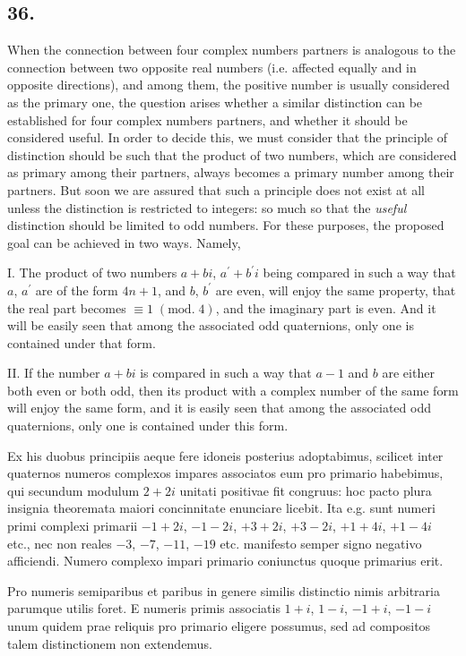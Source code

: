 \documentclass[twoside,12pt, showframe]{memoir}
\renewcommand{\pmod}[1]{\;(\textrm{mod.}\;#1)}
\begin{document}
\subsection*{36.}
 
When the connection between four complex numbers partners is analogous to the connection between two opposite real numbers (i.e. affected equally and in opposite directions), and among them, the positive number is usually considered as the primary one, the question arises whether a similar distinction can be established for four complex numbers partners, and whether it should be considered useful. In order to decide this, we must consider that the principle of distinction should be such that the product of two numbers, which are considered as primary among their partners, always becomes a primary number among their partners. But soon we are assured that such a principle does not exist at all unless the distinction is restricted to integers: so much so that the \textit{useful} distinction should be limited to odd numbers. For these purposes, the proposed goal can be achieved in two ways. Namely,
 
I. The product of two numbers \(a+b i\), \(a^{\prime}+b^{\prime} i\) being compared in such a way that \(a\), \(a^{\prime}\) are of the form \(4 n+1\), and \(b\), \(b^{\prime}\) are even, will enjoy the same property, that the real part becomes \(\equiv 1\pmod{4}\), and the imaginary part is even. And it will be easily seen that among the associated odd quaternions, only one is contained under that form.
 
II. If the number \(a+b i\) is compared in such a way that \(a-1\) and \(b\) are either both even or both odd, then its product with a complex number of the same form will enjoy the same form, and it is easily seen that among the associated odd quaternions, only one is contained under this form.
%

Ex his duobus principiis aeque fere idoneis posterius adoptabimus, scilicet inter quaternos numeros complexos impares associatos eum pro primario habebimus, qui secundum modulum $2+2 i$ unitati positivae fit congruus: hoc pacto plura insignia theoremata maiori concinnitate enunciare licebit. Ita e.g. sunt numeri primi complexi primarii $-1+2 i$, $-1-2 i$, $+3+2 i$, $+3-2 i$, $+1+4 i$, $+1-4 i$ etc., nec non reales $-3$, $-7$, $-11$, $-19$ etc. manifesto semper signo negativo afficiendi. Numero complexo impari primario coniunctus quoque primarius erit.

Pro numeris semiparibus et paribus in genere similis distinctio nimis arbitraria parumque utilis foret. E numeris primis associatis $1+i$, $1-i$, $-1+i$, $-1-i$ unum quidem prae reliquis pro primario eligere possumus, sed ad compositos talem distinctionem non extendemus.
%
\end{document}
